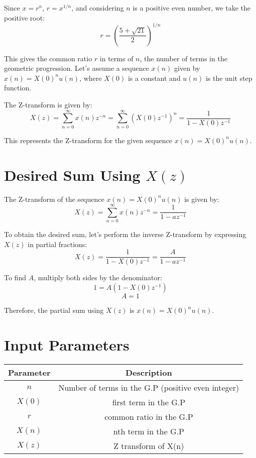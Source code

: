 \documentclass{article}
\begin{document}
Since \( x = r^n \), \( r = x^{1/n} \), and considering \( n \) is a positive even number, we take the positive root:
\[ r = \left(\frac{{5 + \sqrt{21}}}{2}\right)^{1/n} \]

This gives the common ratio \( r \) in terms of \( n \), the number of terms in the geometric progression.
Let's assume a sequence \( x(n) \) given by \( x(n) = X(0)^n u(n) \), where \( X(0) \) is a constant and \( u(n) \) is the unit step function.

The Z-transform is given by:
\[ X(z) = \sum_{n=0}^{\infty} x(n)z^{-n} = \sum_{n=0}^{\infty} (X(0)z^{-1})^n = \frac{1}{1 - X(0)z^{-1}} \]

This represents the Z-transform for the given sequence \( x(n) = X(0)^n u(n) \).
\section*{Desired Sum Using $X(z)$}
The Z-transform of the sequence \( x(n) = X(0)^n u(n) \) is given by:
\[ X(z) = \sum_{n=0}^{\infty} x(n)z^{-n} = \frac{1}{1 - az^{-1}} \]

To obtain the desired sum, let's perform the inverse Z-transform by expressing \( X(z) \) in partial fractions:
\[ X(z) = \frac{1}{1 - X(0)z^{-1}} = \frac{A}{1 - az^{-1}} \]

To find \(A\), multiply both sides by the denominator:
\[ 1 = A(1 - X(0)z^{-1}) \]
\[ A = 1 \]

Therefore, the partial sum using \(X(z)\) is \(x(n) = X(0)^n u(n)\).


\section*{Input Parameters}
\begin{center}
\begin{tabular}{|c|c|}
\hline
Parameter & Description \\
\hline
\( n \) & Number of terms in the G.P (positive even integer) \\
\hline
\(X(0) \) & first term in the G.P \\
\hline
\( r \) & common ratio in the G.P \\
\hline
\( X(n) \) & nth term in the G.P \\
\hline
\( X(z) \) & Z transform of X(n) \\
\hline
\end{tabular}
\end{center}
\end{document}
